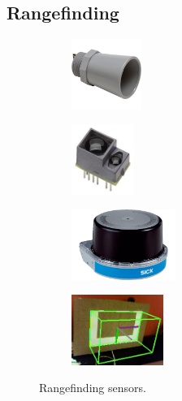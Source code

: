 \subsection{Rangefinding}

\begin{figure}[H]
\begin{subfigure}[b]{.24\linewidth}
\includegraphics[height=0.9in]{imgs/sensor_ultrasonic.jpeg}
\end{subfigure}\begin{subfigure}[b]{.24\linewidth}
\includegraphics[height=0.9in]{imgs/sensor_tof.jpeg}
\end{subfigure}\begin{subfigure}[b]{.24\linewidth}
\includegraphics[height=0.9in]{imgs/sensor_lidar.png}
\end{subfigure}\begin{subfigure}[b]{.24\linewidth}
\includegraphics[height=0.9in]{imgs/sensor_cv.png}
\end{subfigure}
\caption{Rangefinding sensors.}
\end{figure}

